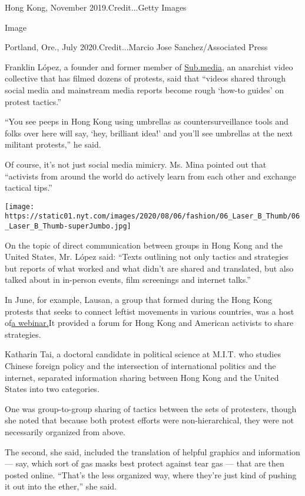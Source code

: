 Hong Kong, November 2019.Credit...Getty Images

Image

Portland, Ore., July 2020.Credit...Marcio Jose Sanchez/Associated Press

Franklin López, a founder and former member of
\href{https://sub.media/}{Sub.media}, an anarchist video collective that
has filmed dozens of protests, said that ``videos shared through social
media and mainstream media reports become rough `how-to guides' on
protest tactics.''

``You see peeps in Hong Kong using umbrellas as countersurveillance
tools and folks over here will say, `hey, brilliant idea!' and you'll
see umbrellas at the next militant protests,'' he said.

Of course, it's not just social media mimicry. Ms. Mina pointed out that
``activists from around the world do actively learn from each other and
exchange tactical tips.''

\texttt{[image: https://static01.nyt.com/images/2020/08/06/fashion/06\_Laser\_B\_Thumb/06\_Laser\_B\_Thumb-superJumbo.jpg]}

On the topic of direct communication between groups in Hong Kong and the
United States, Mr. López said: ``Texts outlining not only tactics and
strategies but reports of what worked and what didn't are shared and
translated, but also talked about in in-person events, film screenings
and internet talks.''

In June, for example, Lausan, a group that formed during the Hong Kong
protests that seeks to connect leftist movements in various countries,
was a host
of\href{https://lausan.hk/2020/notes-from-black-liberation-and-hong-kong/}{a
webinar.}It provided a forum for Hong Kong and American activists to
share strategies.

Katharin Tai, a doctoral candidate in political science at M.I.T. who
studies Chinese foreign policy and the intersection of international
politics and the internet, separated information sharing between Hong
Kong and the United States into two categories.

One was group-to-group sharing of tactics between the sets of
protesters, though she noted that because both protest efforts were
non-hierarchical, they were not necessarily organized from above.

The second, she said, included the translation of helpful graphics and
information --- say, which sort of gas masks best protect against tear
gas --- that are then posted online. ``That's the less organized way,
where they're just kind of pushing it out into the ether,'' she said.

